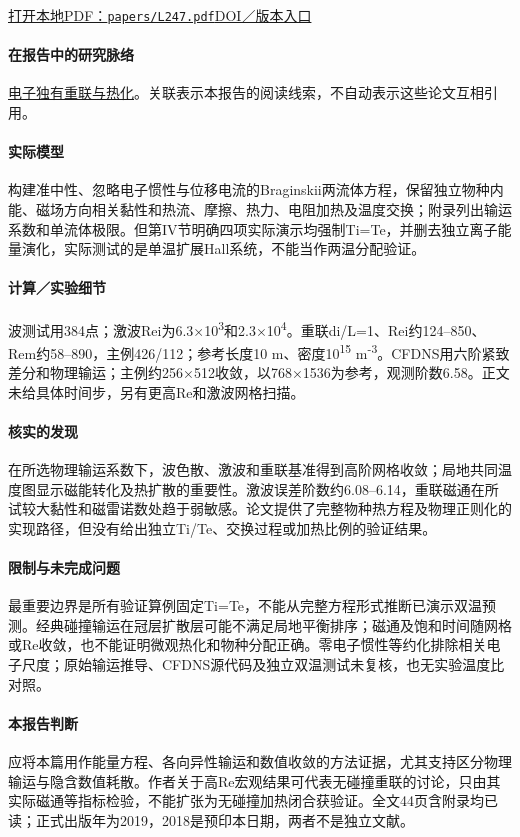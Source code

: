 \documentclass[UTF8,a4paper,11pt,openany,fontset=fandol]{ctexbook}
\begin{document}
\href{run:../papers/L247.pdf}{打开本地PDF：\texttt{papers/L247.pdf}}\quad\href{https://doi.org/10.1063/1.5082190}{DOI／版本入口}

\paragraph{在报告中的研究脉络}\hyperref[story:energy]{电子独有重联与热化}。关联表示本报告的阅读线索，不自动表示这些论文互相引用。

\paragraph{实际模型}构建准中性、忽略电子惯性与位移电流的Braginskii两流体方程，保留独立物种内能、磁场方向相关黏性和热流、摩擦、热力、电阻加热及温度交换；附录列出输运系数和单流体极限。但第IV节明确四项实际演示均强制Ti=Te，并删去独立离子能量演化，实际测试的是单温扩展Hall系统，不能当作两温分配验证。

\paragraph{计算／实验细节}波测试用384点；激波Rei为6.3×10\textsuperscript{3}和2.3×10\textsuperscript{4}。重联di/L=1、Rei约124–850、Rem约58–890，主例426/112；参考长度10 m、密度10\textsuperscript{15} m\textsuperscript{-3}。CFDNS用六阶紧致差分和物理输运；主例约256×512收敛，以768×1536为参考，观测阶数6.58。正文未给具体时间步，另有更高Re和激波网格扫描。

\paragraph{核实的发现}在所选物理输运系数下，波色散、激波和重联基准得到高阶网格收敛；局地共同温度图显示磁能转化及热扩散的重要性。激波误差阶数约6.08–6.14，重联磁通在所试较大黏性和磁雷诺数处趋于弱敏感。论文提供了完整物种热方程及物理正则化的实现路径，但没有给出独立Ti/Te、交换过程或加热比例的验证结果。

\paragraph{限制与未完成问题}最重要边界是所有验证算例固定Ti=Te，不能从完整方程形式推断已演示双温预测。经典碰撞输运在冠层扩散层可能不满足局地平衡排序；磁通及饱和时间随网格或Re收敛，也不能证明微观热化和物种分配正确。零电子惯性等约化排除相关电子尺度；原始输运推导、CFDNS源代码及独立双温测试未复核，也无实验温度比对照。

\paragraph{本报告判断}应将本篇用作能量方程、各向异性输运和数值收敛的方法证据，尤其支持区分物理输运与隐含数值耗散。作者关于高Re宏观结果可代表无碰撞重联的讨论，只由其实际磁通等指标检验，不能扩张为无碰撞加热闭合获验证。全文44页含附录均已读；正式出版年为2019，2018是预印本日期，两者不是独立文献。
\end{document}
